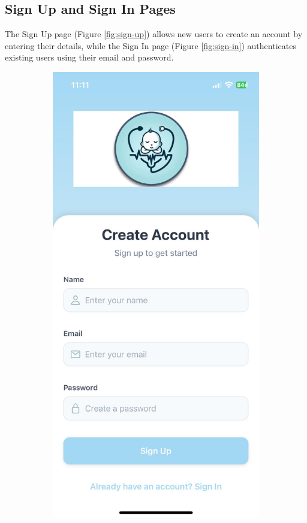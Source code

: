 \documentclass[12pt,a4paper]{report}
\begin{document}
\subsection{Sign Up and Sign In Pages}
The Sign Up page (Figure \ref{fig:sign-up}) allows new users to create an account by entering their details, while the Sign In page (Figure \ref{fig:sign-in}) authenticates existing users using their email and password.
\begin{figure}[H]
  \centering
  \begin{subfigure}[b]{0.22\textwidth}
    \centering
    \includegraphics[width=\textwidth]{./pic/sign-up.jpeg}

\end{subfigure}
\end{figure}
\end{document}
